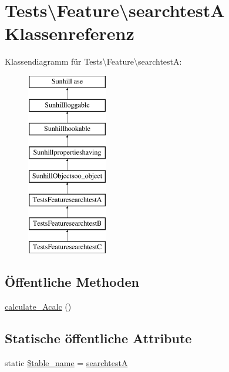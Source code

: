 \hypertarget{classTests_1_1Feature_1_1searchtestA}{}\section{Tests\textbackslash{}Feature\textbackslash{}searchtestA Klassenreferenz}
\label{classTests_1_1Feature_1_1searchtestA}
Klassendiagramm für Tests\textbackslash{}Feature\textbackslash{}searchtestA\+:\begin{figure}[H]
\begin{center}
\leavevmode
\includegraphics[height=8.000000cm]{d3/d40/classTests_1_1Feature_1_1searchtestA}
\end{center}
\end{figure}
\subsection*{Öffentliche Methoden}
\begin{DoxyCompactItemize}
\item 
\hyperlink{classTests_1_1Feature_1_1searchtestA_ad882fb1472112342a779982c8f623208}{calculate\+\_\+\+Acalc} ()
\end{DoxyCompactItemize}
\subsection*{Statische öffentliche Attribute}
\begin{DoxyCompactItemize}
\item 
static \hyperlink{classTests_1_1Feature_1_1searchtestA_acd79aec16940f826e99c2b3fa987beea}{\$table\+\_\+name} = \textquotesingle{}\hyperlink{classTests_1_1Feature_1_1searchtestA}{searchtestA}\textquotesingle{}
\end{DoxyCompactItemize}
